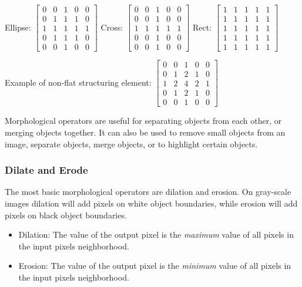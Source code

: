 \noindent Ellipse: 
$\begin{bmatrix}
    0 & 0 & 1 & 0 & 0 \\
    0 & 1 & 1 & 1 & 0 \\
    1 & 1 & 1 & 1 & 1 \\
    0 & 1 & 1 & 1 & 0 \\
    0 & 0 & 1 & 0 & 0
\end{bmatrix}$ 
Cross: 
$\begin{bmatrix}
    0 & 0 & 1 & 0 & 0 \\
    0 & 0 & 1 & 0 & 0 \\
    1 & 1 & 1 & 1 & 1 \\
    0 & 0 & 1 & 0 & 0 \\
    0 & 0 & 1 & 0 & 0 
\end{bmatrix}$
Rect: 
$\begin{bmatrix}
    1 & 1 & 1 & 1 & 1 \\
    1 & 1 & 1 & 1 & 1 \\
    1 & 1 & 1 & 1 & 1 \\
    1 & 1 & 1 & 1 & 1 \\
    1 & 1 & 1 & 1 & 1
\end{bmatrix}$

Example of non-flat structuring element:
$\begin{bmatrix}
    0 & 0 & 1 & 0 & 0 \\
    0 & 1 & 2 & 1 & 0 \\
    1 & 2 & 4 & 2 & 1 \\
    0 & 1 & 2 & 1 & 0 \\
    0 & 0 & 1 & 0 & 0
\end{bmatrix}$ 

Morphological operators are useful for separating objects from each other, or merging objects together. It can also be used to remove small objects from an image, separate objects, merge objects, or to highlight certain objects.


\subsubsection{Dilate and Erode}
The most basic morphological operators are dilation and erosion. On gray-scale images dilation will add pixels on white object boundaries, while erosion will add pixels on black object boundaries.
\begin{itemize}
    \item Dilation: The value of the output pixel is the \textit{maximum} value of all pixels in the input pixels neighborhood. 
    \item Erosion: The value of the output pixel is the \textit{minimum} value of all pixels in the input pixels neighborhood. \cite{website:mathworks_dilation_erosion}
\end{itemize}

